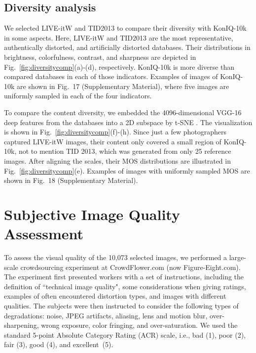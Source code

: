 \documentclass[10pt,journal,compsoc]{IEEEtran}
\begin{document}
\subsection{Diversity analysis}



We selected LIVE-itW and TID2013 to compare their diversity with KonIQ-10k in some aspects. Here, LIVE-itW and TID2013 are the most representative, authentically distorted, and artificially distorted databases. Their distributions in brightness, colorfulness, contrast, and sharpness are depicted in Fig.~\ref{fig:diversitycomp}(a)-(d), respectively. KonIQ-10k is more diverse than compared databases in each of those indicators. Examples of images of KonIQ-10k are shown in Fig.~17 (Supplementary Material), where five images are uniformly sampled in each of the four indicators. 

To compare the content diversity, we embedded the 4096-dimensional VGG-16 deep features from the databases into a 2D subspace by t-SNE \cite{van2008visualizing}. The visualization is shown in Fig.~\ref{fig:diversitycomp}(f)-(h). Since just a few photographers captured LIVE-itW images, their content only covered a small region of KonIQ-10k, not to mention TID 2013, which was generated from only 25 reference images. After aligning the scales, their MOS distributions are illustrated in Fig.~\ref{fig:diversitycomp}(e). Examples of images with uniformly sampled MOS are shown in Fig.~18 (Supplementary Material).


\section{Subjective Image Quality Assessment} 




To assess the visual quality of the 10,073 selected images, we performed a large-scale crowdsourcing experiment at CrowdFlower.com (now Figure-Eight.com). The experiment first presented workers with a set of instructions, including the definition of ``technical image quality", some considerations when giving ratings, examples of often encountered distortion types, and images with different qualities. 
The subjects were then instructed to consider the following types of degradations: noise, JPEG artifacts, aliasing, lens and motion blur, over-sharpening, wrong exposure, color fringing, and over-saturation. We used the standard 5-point Absolute Category Rating (ACR) scale, i.e., bad (1), poor (2), fair (3), good (4), and excellent~(5). 
\end{document}
